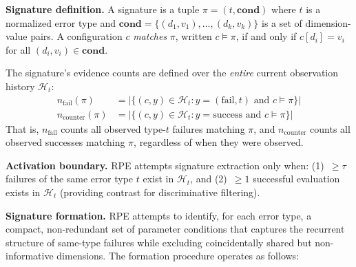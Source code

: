 \documentclass[journal]{IEEEtran}
\begin{document}
\textbf{Signature definition.} A signature is a tuple $\pi = (t, \mathbf{cond})$ where $t$ is a normalized error type and $\mathbf{cond} = \{(d_1, v_1), \ldots, (d_k, v_k)\}$ is a set of dimension-value pairs. A configuration $c$ \emph{matches} $\pi$, written $c \models \pi$, if and only if $c[d_i] = v_i$ for all $(d_i, v_i) \in \mathbf{cond}$.

The signature's evidence counts are defined over the \emph{entire} current observation history $\mathcal{H}_t$:
\begin{align}
n_{\text{fail}}(\pi) &= |\{(c,y) \in \mathcal{H}_t : y = (\text{fail}, t) \text{ and } c \models \pi\}| \label{eq:nfail} \\
n_{\text{counter}}(\pi) &= |\{(c,y) \in \mathcal{H}_t : y = \text{success} \text{ and } c \models \pi\}| \label{eq:ncounter}
\end{align}
That is, $n_{\text{fail}}$ counts all observed type-$t$ failures matching $\pi$, and $n_{\text{counter}}$ counts all observed successes matching $\pi$, regardless of when they were observed.

\textbf{Activation boundary.} RPE attempts signature extraction only when: (1)~$\geq \tau$ failures of the same error type $t$ exist in $\mathcal{H}_t$, and (2)~$\geq 1$ successful evaluation exists in $\mathcal{H}_t$ (providing contrast for discriminative filtering).

\textbf{Signature formation.} RPE attempts to identify, for each error type, a compact, non-redundant set of parameter conditions that captures the recurrent structure of same-type failures while excluding coincidentally shared but non-informative dimensions. The formation procedure operates as follows:
\end{document}
